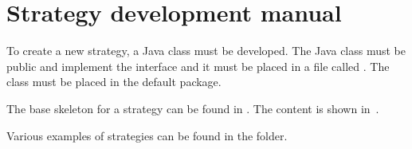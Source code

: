 \chapter{Strategy development manual}\label{appendix:devman}

To create a new strategy, a Java class must be developed. The Java class must
be public and implement the  interface and
it must be placed in a file called . The class must be
placed in the default package.

The base skeleton for a strategy can be found in .
The content is shown in~.

Various examples of strategies can be found in the  folder.


